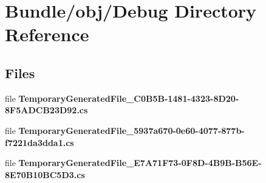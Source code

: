 \section{Bundle/obj/\+Debug Directory Reference}
\label{dir_a5ef3685cb0c0b599b19a0c57b07691e}
\subsection*{Files}
\begin{DoxyCompactItemize}
\item 
file {\bfseries Temporary\+Generated\+File\+\_\+C0\+B5\+B-\/1481-\/4323-\/8\+D20-\/8\+F5\+A\+D\+C\+B23\+D92.\+cs}
\item 
file {\bfseries Temporary\+Generated\+File\+\_\+5937a670-\/0e60-\/4077-\/877b-\/f7221da3dda1.\+cs}
\item 
file {\bfseries Temporary\+Generated\+File\+\_\+\+E7\+A71\+F73-\/0\+F8\+D-\/4\+B9\+B-\/\+B56\+E-\/8\+E70\+B10\+B\+C5\+D3.\+cs}
\end{DoxyCompactItemize}
